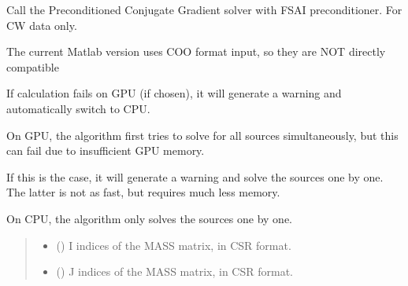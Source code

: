 \documentclass[letterpaper,10pt,english]{sphinxmanual}
\begin{document}
\begin{fulllineitems}
\label{\detokenize{_autosummary/nirfasterff.math.get_field_CW:nirfasterff.math.get_field_CW}}
\pysigstartsignatures
{}
\pysigstopsignatures
\sphinxAtStartPar
Call the Preconditioned Conjugate Gradient solver with FSAI preconditioner. For CW data only.

\sphinxAtStartPar
The current Matlab version uses COO format input, so they are NOT directly compatible

\sphinxAtStartPar
If calculation fails on GPU (if chosen), it will generate a warning and automatically switch to CPU.

\sphinxAtStartPar
On GPU, the algorithm first tries to solve for all sources simultaneously, but this can fail due to insufficient GPU memory.

\sphinxAtStartPar
If this is the case, it will generate a warning and solve the sources one by one. The latter is not as fast, but requires much less memory.

\sphinxAtStartPar
On CPU, the algorithm only solves the sources one by one.
\begin{quote}\begin{description}
\begin{itemize}
\item {} 
\sphinxAtStartPar
{} (\sphinxstyleliteralemphasis{\sphinxupquote{, }}) \textendash{} I indices of the MASS matrix, in CSR format.

\item {} 
\sphinxAtStartPar
{} (\sphinxstyleliteralemphasis{\sphinxupquote{, }}) \textendash{} J indices of the MASS matrix, in CSR format.


\end{itemize}
\end{description}
\end{quote}
\end{fulllineitems}
\end{document}

